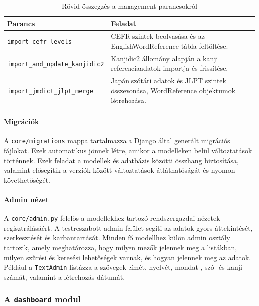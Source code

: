 \begin{table}[H]
	\centering
	\begin{tabular}{ | m{} | m{} | }
		\hline
		\textbf{Parancs} & \textbf{Feladat} \\
		\hline \hline
		\texttt{import\_cefr\_levels} & CEFR szintek beolvasása és az EnglishWordReference tábla feltöltése. \\
		\hline
		\texttt{import\_and\_update\_kanjidic2} &  Kanjidic2 állomány alapján a kanji referenciaadatok importja és frissítése. \\
		\hline
		\texttt{import\_jmdict\_jlpt\_merge} & Japán szótári adatok és JLPT szintek összevonása, WordReference objektumok létrehozása. \\
		\hline
	\end{tabular}
	\caption{Rövid összegzés a management parancsokról}
	\label{tab:management}
\end{table}

\paragraph{Migrációk}

A \texttt{core/migrations} mappa tartalmazza a Django által generált migrációs fájlokat. Ezek automatikus jönnek létre, amikor a modelleken belül változtatások történnek. Ezek feladat a modellek és adatbázis közötti összhang biztosítása, valamint elősegítik a verziók között változtatások átláthatóságát és nyomon követhetőségét. 

\paragraph{Admin nézet}

A \texttt{core/admin.py} felelős a modellekhez tartozó rendszergazdai nézetek regisztrálásáért. A testreszabott admin felület segíti az adatok gyors áttekintését, szerkesztését és karbantartását. Minden fő modellhez külön admin osztály tartozik, amely meghatározza, hogy milyen mezők jelennek meg a listákban, milyen szűrési és keresési lehetőségek vannak, és hogyan jelennek meg az adatok. Például a \texttt{TextAdmin} listázza a szövegek címét, nyelvét, mondat-, szó- és kanji-számát, valamint a létrehozás dátumát.

\subsubsection{A \texttt{dashboard} modul}

